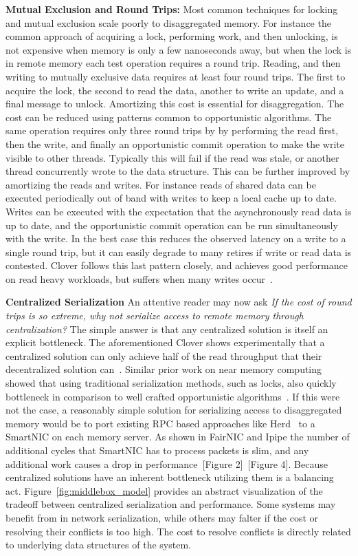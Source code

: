 \textbf{Mutual Exclusion and Round Trips:} 
Most common techniques for locking
and mutual exclusion scale poorly to disaggregated memory. For instance the
common approach of acquiring a lock, performing work, and then unlocking, is not
expensive when memory is only a few nanoseconds away, but when the lock is in
remote memory each test operation requires a round trip.  Reading, and then
writing to mutually exclusive data requires at least four round trips. The first
to acquire the lock, the second to read the data, another to write an update,
and a final message to unlock.  Amortizing this cost is essential for
disaggregation. The cost can be reduced using patterns common to opportunistic
algorithms. The same operation requires only three round trips by by performing
the read first, then the write, and finally an opportunistic commit operation to
make the write visible to other threads. Typically this will fail if the read
was stale, or another thread concurrently wrote to the data structure. This can
be further improved by amortizing the reads and writes. For instance reads of
shared data can be executed periodically out of band with writes to keep a local
cache up to date.  Writes can be executed with the expectation that the
asynchronously read data is up to date, and the opportunistic commit operation
can be run simultaneously with the write. In the best case this reduces the
observed latency on a write to a single round trip, but it can easily degrade to
many retires if write or read data is contested. Clover follows this last
pattern closely, and achieves good performance on read heavy workloads, but
suffers when many writes occur~\cite{clover}.


\textbf{Centralized Serialization} 
An attentive reader may now ask \textit{If the cost of round trips is so
extreme, why not serialize access to remote memory through centralization?} The
simple answer is that any centralized solution is itself an explicit bottleneck.
The aforementioned Clover shows experimentally that a centralized solution can
only achieve half of the read throughput that their decentralized solution
can~\cite{clover}. Similar prior work on near memory computing showed that using
traditional serialization methods, such as locks, also quickly bottleneck in
comparison to well crafted opportunistic algorithms~\cite{near-memory-structs}.
If this were not the case, a reasonably simple solution for serializing access
to disaggregated memory would be to port existing RPC based approaches like
Herd~\cite{herd} to a SmartNIC on each memory server. As shown in FairNIC and
Ipipe the number of additional cycles that SmartNIC has to process packets is
slim, and any additional work causes a drop in performance~\cite{fairnic}[Figure
2]~\cite{ipipe}[Figure 4]. Because centralized solutions have an inherent
bottleneck utilizing them is a balancing act. Figure~\ref{fig:middlebox_model}
provides an abstract visualization of the tradeoff between centralized
serialization and performance. Some systems may benefit from in network
serialization, while others may falter if the cost or resolving their conflicts
is too high. The cost to resolve conflicts is directly related to underlying
data structures of the system.

